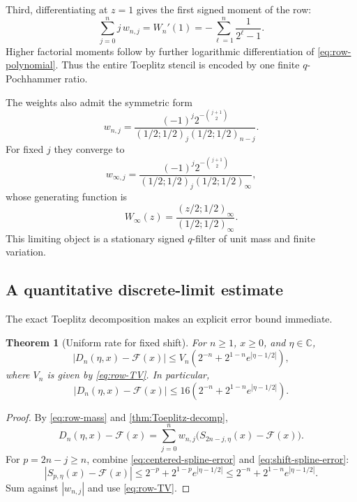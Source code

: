 \documentclass[11pt,oneside]{article}
\newtheorem{theorem}{Theorem}[section]
\theoremstyle{definition}
\theoremstyle{remark}
\newcommand{\C}{\mathbb C}
\newcommand{\poch}[3]{\left(#1;#2\right)_{#3}}
\newcommand{\Fglobal}{\mathcal F}
\begin{document}
Third, differentiating at $z=1$ gives the first signed moment of the row:
\begin{equation}\label{eq:row-first-moment}
 \sum_{j=0}^{n}j\,w_{n,j}
 =W_n'(1)
 =-\sum_{\ell=1}^{n}\frac1{2^\ell-1}.
\end{equation}
Higher factorial moments follow by further logarithmic differentiation of
\eqref{eq:row-polynomial}.  Thus the entire Toeplitz stencil is encoded by one
finite $q$-Pochhammer ratio.

The weights also admit the symmetric form
\begin{equation}\label{eq:weights-symmetric}
 w_{n,j}=
 \frac{(-1)^j2^{-\binom{j+1}{2}}}
 {\poch{1/2}{1/2}{j}\poch{1/2}{1/2}{n-j}}.
\end{equation}
For fixed $j$ they converge to
\begin{equation}\label{eq:limit-weights}
 w_{\infty,j}=
 \frac{(-1)^j2^{-\binom{j+1}{2}}}
 {\poch{1/2}{1/2}{j}\poch{1/2}{1/2}{\infty}},
\end{equation}
whose generating function is
\begin{equation}\label{eq:limit-filter}
 W_\infty(z)=
 \frac{\poch{z/2}{1/2}{\infty}}
 {\poch{1/2}{1/2}{\infty}}.
\end{equation}
This limiting object is a stationary signed $q$-filter of unit mass and finite
variation.

\subsection{A quantitative discrete-limit estimate}

The exact Toeplitz decomposition makes an explicit error bound immediate.

\begin{theorem}[Uniform rate for fixed shift]\label{thm:Dn-rate}
For $n\ge1$, $x\ge0$, and $\eta\in\C$,
\begin{equation}\label{eq:Dn-rate}
 \boxed{
 |D_n(\eta,x)-\Fglobal(x)|
 \le V_n\left(2^{-n}+2^{1-n}e^{|\eta-1/2|}\right),}
\end{equation}
where $V_n$ is given by \eqref{eq:row-TV}.  In particular,
\begin{equation}\label{eq:Dn-rate-16}
 |D_n(\eta,x)-\Fglobal(x)|
 \le16\left(2^{-n}+2^{1-n}e^{|\eta-1/2|}\right).
\end{equation}
\end{theorem}

\begin{proof}
By \eqref{eq:row-mass} and \cref{thm:Toeplitz-decomp},
\[
 D_n(\eta,x)-\Fglobal(x)
 =\sum_{j=0}^{n}w_{n,j}
  \bigl(S_{2n-j,\eta}(x)-\Fglobal(x)\bigr).
\]
For $p=2n-j\ge n$, combine
\eqref{eq:centered-spline-error} and \eqref{eq:shift-spline-error}:
\[
 |S_{p,\eta}(x)-\Fglobal(x)|
 \le2^{-p}+2^{1-p}e^{|\eta-1/2|}
 \le2^{-n}+2^{1-n}e^{|\eta-1/2|}.
\]
Sum against $|w_{n,j}|$ and use \eqref{eq:row-TV}.
\end{proof}
\end{document}
